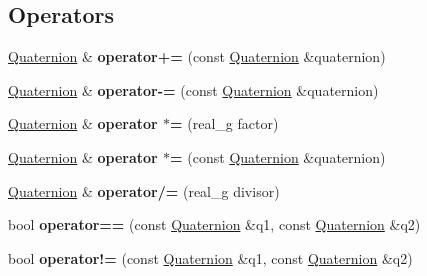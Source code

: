 \subsection*{Operators}
\begin{DoxyCompactItemize}
\item 
\mbox{\label{classrev_1_1_quaternion_a1dc9f4d91706f1907f20b590c2e5073b}} 
\mbox{\hyperlink{classrev_1_1_quaternion}{Quaternion}} \& {\bfseries operator+=} (const \mbox{\hyperlink{classrev_1_1_quaternion}{Quaternion}} \&quaternion)
\item 
\mbox{\label{classrev_1_1_quaternion_a1362eeb514ab11500add8597023e188a}} 
\mbox{\hyperlink{classrev_1_1_quaternion}{Quaternion}} \& {\bfseries operator-\/=} (const \mbox{\hyperlink{classrev_1_1_quaternion}{Quaternion}} \&quaternion)
\item 
\mbox{\label{classrev_1_1_quaternion_ad06d85f792882e758848c26f0e57ea13}} 
\mbox{\hyperlink{classrev_1_1_quaternion}{Quaternion}} \& {\bfseries operator $\ast$=} (real\+\_\+g factor)
\item 
\mbox{\label{classrev_1_1_quaternion_a56b20d7f3a655314ca7df48a36862259}} 
\mbox{\hyperlink{classrev_1_1_quaternion}{Quaternion}} \& {\bfseries operator $\ast$=} (const \mbox{\hyperlink{classrev_1_1_quaternion}{Quaternion}} \&quaternion)
\item 
\mbox{\label{classrev_1_1_quaternion_a80b443b9e97a342734cfb60b786c75a6}} 
\mbox{\hyperlink{classrev_1_1_quaternion}{Quaternion}} \& {\bfseries operator/=} (real\+\_\+g divisor)
\item 
\mbox{\label{classrev_1_1_quaternion_ad8307baf80313282ff56ce12f66f9c33}} 
bool {\bfseries operator==} (const \mbox{\hyperlink{classrev_1_1_quaternion}{Quaternion}} \&q1, const \mbox{\hyperlink{classrev_1_1_quaternion}{Quaternion}} \&q2)
\item 
\mbox{\label{classrev_1_1_quaternion_a28b8582c664386799189290690e40da8}} 
bool {\bfseries operator!=} (const \mbox{\hyperlink{classrev_1_1_quaternion}{Quaternion}} \&q1, const \mbox{\hyperlink{classrev_1_1_quaternion}{Quaternion}} \&q2)

\end{DoxyCompactItemize}
